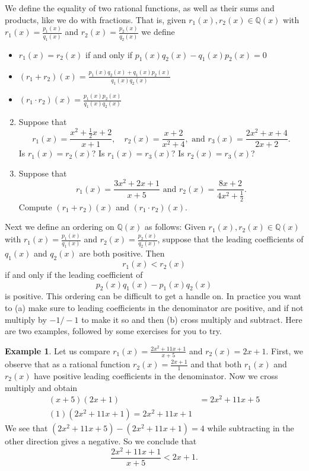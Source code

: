\documentclass[11pt]{article}
\newenvironment{task}
	{\begin{mdframed}[linecolor=lightgray, linewidth=3pt]\raggedright}
	{\end{mdframed}}
\theoremstyle{definition}
\newtheorem{example}[theorem]{Example}
\begin{document}
\begin{task}
We define the equality of two rational functions, as well as their sums and products, like we do with fractions. That is, given $r_1(x),r_2(x)\in\mathbb{Q}(x)$ with
$r_1(x) = \frac{p_1(x)}{q_1(x)}$ and $r_2(x) = \frac{p_2(x)}{q_2(x)}$ we define
\begin{itemize}
  \item $r_1(x)=r_2(x)$ if and only if $p_1(x)q_2(x) - q_1(x)p_2(x) = 0$
  \item $(r_1 + r_2)(x) = \frac{p_1(x)q_2(x) + q_1(x)p_2(x)}{q_1(x)q_2(x)}$
  \item $(r_1\cdot r_2)(x) = \frac{p_1(x)p_2(x)}{q_1(x)q_2(x)}$
\end{itemize}

\begin{enumerate}
    \setcounter{enumi}{1}
  \item Suppose that
    \[ r_1(x) = \frac{x^2 + \frac{1}{2}x + 2}{x+1},\quad  r_2(x) = \frac{x + 2}{x^2 +4}, \text{ and } r_3(x)=\frac{2x^2 + x + 4}{2x+2}.\]
    Is $r_1(x) = r_2(x)$? Is $r_1(x) = r_3(x)$? Is $r_2(x) = r_3(x)$?
        \vspace{1.25in}
  \item Suppose that 
    \[ r_1(x) = \frac{3x^2 + 2x + 1}{x+5} \text{ and } r_2(x) = \frac{8x + 2}{4x^2 +\frac{1}{2}}.\]
    Compute $(r_1+r_2)(x)$ and $(r_1\cdot r_2)(x)$.
        \vspace{1.25in}
\end{enumerate}

Next we define an ordering on $\mathbb{Q}(x)$ as follows: Given $r_1(x),r_2(x)\in\mathbb{Q}(x)$ with
$r_1(x) = \frac{p_1(x)}{q_1(x)}$ and $r_2(x) = \frac{p_2(x)}{q_2(x)}$, suppose that the leading coefficients of $q_1(x)$ and $q_2(x)$ are both positive. Then
\[ r_1(x) < r_2(x) \] 
if and only if the leading coefficient of 
\[ p_2(x)q_1(x) - p_1(x)q_2(x) \]
is positive. This ordering can be difficult to get a handle on. In practice you want to (a) make sure to leading coefficients in the denominator are positive, and
if not multiply by $-1/-1$ to make it so and then (b) cross multiply and subtract. Here are two examples, followed by some exercises for you to try.

\begin{example}
  Let us compare $r_1(x) = \frac{2x^2 + 11x + 1}{x+5}$ and $r_2(x) = 2x +1$. First, we observe that as a rational function $r_2(x) = \frac{2x+1}{1}$ and 
  that both $r_1(x)$ and $r_2(x)$ have positive leading coefficients in the denominator. Now we cross multiply and obtain
  \begin{align*}
    (x+5)(2x+1) &= 2x^2 + 11x + 5\\
    (1)(2x^2 + 11x + 1) = 2x^2 + 11x + 1
  \end{align*}
  We see that $(2x^2+11x + 5)-(2x^2+11x+1) = 4$ while subtracting in the other direction gives a negative. So we conclude that
  \[ \frac{2x^2+11x+1}{x+5} < 2x + 1.\]
\end{example}


\end{task}
\end{document}

